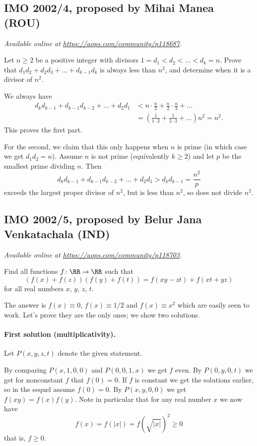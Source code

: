 \documentclass[11pt]{scrartcl}
\begin{document}
\subsection{IMO 2002/4, proposed by Mihai Manea (ROU)}
\textsl{Available online at \url{https://aops.com/community/p118687}.}
\begin{mdframed}[style=mdpurplebox,frametitle={Problem statement}]
Let $n \ge 2$ be a positive integer
with divisors $1 = d_1 < d_2 < \dots < d_k = n$.
Prove that $d_1d_2 + d_2d_3 + \dots + d_{k-1} d_k$ is always less than $n^2$,
and determine when it is a divisor of $n^2$.
\end{mdframed}
We always have
\begin{align*}
  d_k d_{k-1} + d_{k-1} d_{k-2} + \dots + d_2 d_1
  &< n \cdot \frac n2 + \frac n2 \cdot \frac n3 + \dots \\
  &= \left( \frac{1}{1 \cdot 2} + \frac{1}{2 \cdot 3} + \dots \right) n^2 = n^2.
\end{align*}
This proves the first part.

For the second, we claim that this only happens
when $n$ is prime (in which case we get $d_1 d_2 = n$).
Assume $n$ is not prime (equivalently $k \ge 2$)
and let $p$ be the smallest prime dividing $n$.
Then
\[ d_k d_{k-1} + d_{k-1} d_{k-2} + \dots + d_2 d_1
  > d_k d_{k-1} = \frac{n^2}{p} \]
exceeds the largest proper divisor of $n^2$,
but is less than $n^2$, so does not divide $n^2$.
\pagebreak

\subsection{IMO 2002/5, proposed by Belur Jana Venkatachala (IND)}
\textsl{Available online at \url{https://aops.com/community/p118703}.}
\begin{mdframed}[style=mdpurplebox,frametitle={Problem statement}]
Find all functions $f \colon \RR \to \RR$ such that
\[ \left(f(x)+f(z)\right)\left(f(y)+f(t)\right)
  = f(xy-zt)+f(xt+yz) \]
for all real numbers $x$, $y$, $z$, $t$.
\end{mdframed}
The answer is $f(x) \equiv 0$, $f(x) \equiv 1/2$
and $f(x) \equiv x^2$ which are easily seen to work.
Let's prove they are the only ones;
we show two solutions.

\paragraph{First solution (multiplicativity).}
Let $P(x,y,z,t)$ denote the given statement.
\begin{itemize}
  \ii By comparing $P(x,1,0,0)$ and $P(0,0,1,x)$
  we get $\boxed{f \text{ even}}$.
  \ii By $P(0,y,0,t)$ we get for nonconstant $f$
  that $f(0) = 0$.
  If $f$ is constant we get the solutions earlier,
  so in the sequel assume $\boxed{f(0) = 0}$.
  \ii By $P(x,y,0,0)$ we get $\boxed{f(xy) = f(x) f(y)}$.
  Note in particular that for any real number $x$ we now have
  \[ f(x) = f(|x|) = f\left( \sqrt{|x|} \right)^2 \ge 0 \]
  that is, $f \ge 0$.
\end{itemize}
\end{document}
